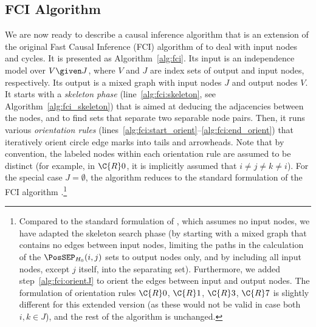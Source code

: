 \subsection{FCI Algorithm}

We are now ready to describe a causal inference algorithm that is an extension of the original
Fast Causal Inference (FCI) algorithm of \cite{SMR1995} to deal with input nodes and cycles.
It is presented as Algorithm~\ref{alg:fci}.
Its input is an independence model over $V \given J$, where $V$ and $J$ are index sets of output and input nodes, respectively. 
Its output is a mixed graph with input nodes $J$ and output nodes $V$.
It starts with a \emph{skeleton phase} (line~\ref{alg:fci:skeleton}, see Algorithm~\ref{alg:fci_skeleton}) that is aimed at deducing the adjacencies between the nodes, and to find sets that separate two separable node pairs.
Then, it runs various \emph{orientation rules} (lines~\ref{alg:fci:start_orient}--\ref{alg:fci:end_orient}) that iteratively orient circle edge marks into tails and arrowheads.
Note that by convention, the labeled nodes within each orientation rule are assumed to be distinct (for example, in $\C{R}0$, it is implicitly assumed that $i \ne j \ne k \ne i$).
For the special case $J = \emptyset$, the algorithm reduces to the standard formulation of the FCI algorithm \cite{Zhang2008_AI}.\footnote{Compared to the standard formulation of \cite{Zhang2008_AI}, which assumes no input nodes, we have adapted the skeleton search phase (by starting with a mixed graph that
contains no edges between input nodes, limiting the paths in the calculation of the
$\PosSEP_{H_0}(i,j)$ sets to output nodes only, and by including all input nodes, 
except $j$ itself, into the separating set). Furthermore, we added 
step~\ref{alg:fci:orientJ} to orient the edges between input and output nodes. 
The formulation of orientation rules $\C{R}0$, $\C{R}1$, $\C{R}3$, $\C{R}7$ is slightly different for this extended version
(as these would not be valid in case both $i, k \in J$), and the rest of the algorithm is unchanged.}



